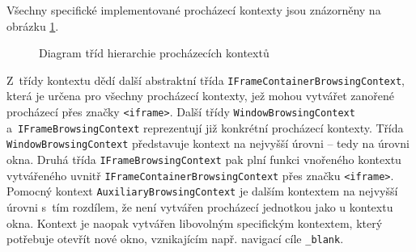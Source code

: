 \noindent Všechny specifické implementované procházecí kontexty jsou znázorněny na obrázku \ref{Figure.BrowsingContextsHierarchy}.

\begin{figure}[H]
  \begin{center}
    \caption{Diagram tříd hierarchie procházecích kontextů}
    \label{Figure.BrowsingContextsHierarchy}
  \end{center}
\end{figure}

Z~třídy kontextu dědí další abstraktní třída \texttt{IFrameContainerBrowsingContext}, která je určena pro všechny procházecí kontexty, jež mohou vytvářet zanořené procházecí přes značky \texttt{<iframe>}. Další třídy \texttt{WindowBrowsingContext} a~\texttt{IFrameBrowsingContext} reprezentují již konkrétní procházecí kontexty. Třída \texttt{WindowBrowsingContext} představuje kontext na nejvyšší úrovni -- tedy na úrovni okna. Druhá třída \texttt{IFrameBrowsingContext} pak plní funkci vnořeného kontextu vytvářeného uvnitř \texttt{IFrameContainerBrowsingContext} přes značku \texttt{<iframe>}. Pomocný kontext \texttt{AuxiliaryBrowsingContext} je dalším kontextem na nejvyšší úrovni s~tím rozdílem, že není vytvářen procházecí jednotkou jako u kontextu okna. Kontext je naopak vytvářen libovolným specifickým kontextem, který potřebuje otevřít nové okno, vznikajícím např. navigací cíle \texttt{\_blank}.


